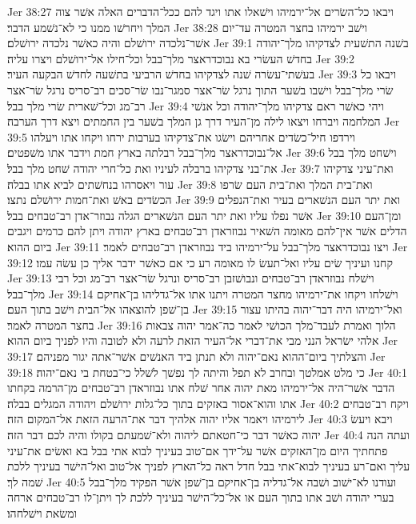 Jer 38:27  ויבאו כל־השׂרים אל־ירמיהו וישׁאלו אתו ויגד להם ככל־הדברים האלה אשׁר צוה המלך ויחרשׁו ממנו כי לא־נשׁמע הדבר׃
Jer 38:28  וישׁב ירמיהו בחצר המטרה עד־יום אשׁר־נלכדה ירושׁלם והיה כאשׁר נלכדה ירושׁלם׃
Jer 39:1  בשׁנה התשׁעית לצדקיהו מלך־יהודה בחדשׁ העשׂרי בא נבוכדראצר מלך־בבל וכל־חילו אל־ירושׁלם ויצרו עליה׃
Jer 39:2  בעשׁתי־עשׂרה שׁנה לצדקיהו בחדשׁ הרביעי בתשׁעה לחדשׁ הבקעה העיר׃
Jer 39:3  ויבאו כל שׂרי מלך־בבל וישׁבו בשׁער התוך נרגל שׂר־אצר סמגר־נבו שׂר־סכים רב־סריס נרגל שׂר־אצר רב־מג וכל־שׁארית שׂרי מלך בבל׃
Jer 39:4  ויהי כאשׁר ראם צדקיהו מלך־יהודה וכל אנשׁי המלחמה ויברחו ויצאו לילה מן־העיר דרך גן המלך בשׁער בין החמתים ויצא דרך הערבה׃
Jer 39:5  וירדפו חיל־כשׂדים אחריהם וישׂגו את־צדקיהו בערבות ירחו ויקחו אתו ויעלהו אל־נבוכדראצר מלך־בבל רבלתה בארץ חמת וידבר אתו משׁפטים׃
Jer 39:6  וישׁחט מלך בבל את־בני צדקיהו ברבלה לעיניו ואת כל־חרי יהודה שׁחט מלך בבל׃
Jer 39:7  ואת־עיני צדקיהו עור ויאסרהו בנחשׁתים לביא אתו בבלה׃
Jer 39:8  ואת־בית המלך ואת־בית העם שׂרפו הכשׂדים באשׁ ואת־חמות ירושׁלם נתצו׃
Jer 39:9  ואת יתר העם הנשׁארים בעיר ואת־הנפלים אשׁר נפלו עליו ואת יתר העם הנשׁארים הגלה נבוזר־אדן רב־טבחים בבל׃
Jer 39:10  ומן־העם הדלים אשׁר אין־להם מאומה השׁאיר נבוזראדן רב־טבחים בארץ יהודה ויתן להם כרמים ויגבים ביום ההוא׃
Jer 39:11  ויצו נבוכדראצר מלך־בבל על־ירמיהו ביד נבוזראדן רב־טבחים לאמר׃
Jer 39:12  קחנו ועיניך שׂים עליו ואל־תעשׂ לו מאומה רע כי אם כאשׁר ידבר אליך כן עשׂה עמו׃
Jer 39:13  וישׁלח נבוזראדן רב־טבחים ונבושׁזבן רב־סריס ונרגל שׂר־אצר רב־מג וכל רבי מלך־בבל׃
Jer 39:14  וישׁלחו ויקחו את־ירמיהו מחצר המטרה ויתנו אתו אל־גדליהו בן־אחיקם בן־שׁפן להוצאהו אל־הבית וישׁב בתוך העם׃
Jer 39:15  ואל־ירמיהו היה דבר־יהוה בהיתו עצור בחצר המטרה לאמר׃
Jer 39:16  הלוך ואמרת לעבד־מלך הכושׁי לאמר כה־אמר יהוה צבאות אלהי ישׂראל הנני מבי את־דברי אל־העיר הזאת לרעה ולא לטובה והיו לפניך ביום ההוא׃
Jer 39:17  והצלתיך ביום־ההוא נאם־יהוה ולא תנתן ביד האנשׁים אשׁר־אתה יגור מפניהם׃
Jer 39:18  כי מלט אמלטך ובחרב לא תפל והיתה לך נפשׁך לשׁלל כי־בטחת בי נאם־יהוה׃
Jer 40:1  הדבר אשׁר־היה אל־ירמיהו מאת יהוה אחר שׁלח אתו נבוזראדן רב־טבחים מן־הרמה בקחתו אתו והוא־אסור באזקים בתוך כל־גלות ירושׁלם ויהודה המגלים בבלה׃
Jer 40:2  ויקח רב־טבחים לירמיהו ויאמר אליו יהוה אלהיך דבר את־הרעה הזאת אל־המקום הזה׃
Jer 40:3  ויבא ויעשׂ יהוה כאשׁר דבר כי־חטאתם ליהוה ולא־שׁמעתם בקולו והיה לכם דבר הזה׃
Jer 40:4  ועתה הנה פתחתיך היום מן־האזקים אשׁר על־ידך אם־טוב בעיניך לבוא אתי בבל בא ואשׂים את־עיני עליך ואם־רע בעיניך לבוא־אתי בבל חדל ראה כל־הארץ לפניך אל־טוב ואל־הישׁר בעיניך ללכת שׁמה לך׃
Jer 40:5  ועודנו לא־ישׁוב ושׁבה אל־גדליה בן־אחיקם בן־שׁפן אשׁר הפקיד מלך־בבל בערי יהודה ושׁב אתו בתוך העם או אל־כל־הישׁר בעיניך ללכת לך ויתן־לו רב־טבחים ארחה ומשׂאת וישׁלחהו׃
